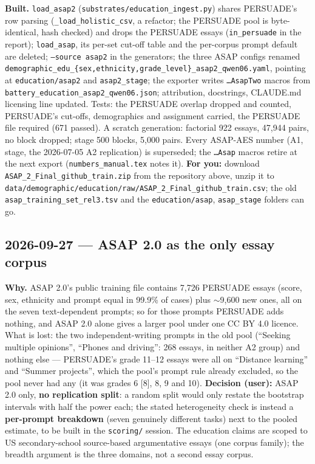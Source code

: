 \documentclass{article}
\begin{document}
\textbf{Built.} \texttt{load\_asap2} (\texttt{substrates/education\_ingest.py}) shares PERSUADE's row parsing
(\texttt{\_load\_holistic\_csv}, a refactor; the PERSUADE pool is byte-identical, hash checked) and drops the
PERSUADE essays (\texttt{in\_persuade} in the report); \texttt{load\_asap}, its per-set cut-off table and the
per-corpus prompt default are deleted; \texttt{--source asap2} in the generators; the three ASAP configs renamed
\texttt{demographic\_edu\_\{sex,ethnicity,grade\_level\}\_asap2\_qwen06.yaml}, pointing at
\texttt{education/asap2} and \texttt{asap2\_stage}; the exporter writes \texttt{\dots AsapTwo} macros from
\texttt{battery\_education\_asap2\_qwen06.json}; attribution, docstrings, CLAUDE.md licensing line updated.
Tests: the PERSUADE overlap dropped and counted, PERSUADE's cut-offs, demographics and assignment carried, the
PERSUADE file required (671 passed). A scratch generation: factorial 922 essays, 47{,}944 pairs, no block
dropped; stage 500 blocks, 5{,}000 pairs. Every ASAP-AES number (A1, stage, the 2026-07-05 A2 replication) is
superseded; the \texttt{\dots Asap} macros retire at the next export (\texttt{numbers\_manual.tex} notes it).
\textbf{For you:} download \texttt{ASAP\_2\_Final\_github\_train.zip} from the repository above, unzip it to
\texttt{data/demographic/education/raw/ASAP\_2\_Final\_github\_train.csv}; the old
\texttt{asap\_training\_set\_rel3.tsv} and the \texttt{education/asap}, \texttt{asap\_stage} folders can go.

\subsection*{2026-09-27 --- ASAP 2.0 as the only essay corpus}
\textbf{Why.} ASAP 2.0's public training file contains 7{,}726 PERSUADE essays (score, sex, ethnicity and prompt
equal in 99.9\% of cases) plus $\sim$9{,}600 new ones, all on the seven text-dependent prompts; so for those prompts
PERSUADE adds nothing, and ASAP 2.0 alone gives a larger pool under one CC BY 4.0 licence. What is lost: the two
independent-writing prompts in the old pool (``Seeking multiple opinions'', ``Phones and driving'': 268 essays, in
neither A2 group) and nothing else --- PERSUADE's grade 11--12 essays were all on ``Distance learning'' and
``Summer projects'', which the pool's prompt rule already excluded, so the pool never had any (it was grades 6
[8], 8, 9 and 10). \textbf{Decision (user):} ASAP 2.0 only, \textbf{no replication split}: a random split would
only restate the bootstrap intervals with half the power each; the stated heterogeneity check is instead a
\textbf{per-prompt breakdown} (seven genuinely different tasks) next to the pooled estimate, to be built in the
\texttt{scoring/} session. The education claims are scoped to US secondary-school source-based argumentative
essays (one corpus family); the breadth argument is the three domains, not a second essay corpus.
\end{document}
